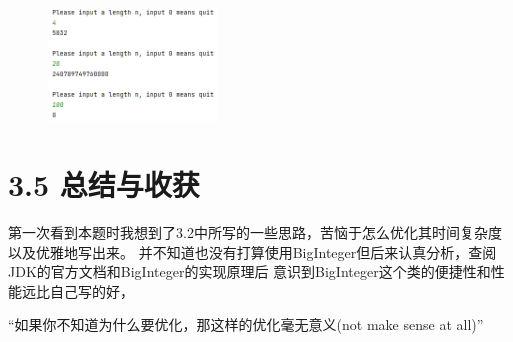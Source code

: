 \begin{figure}[H]
    \centering
    \includegraphics[width = 0.4\textwidth]{../pic/3/3.1.png}
\end{figure}

\section{3.5 总结与收获}

第一次看到本题时我想到了3.2中所写的一些思路，苦恼于怎么优化其时间复杂度以及优雅地写出来。
并不知道也没有打算使用BigInteger但后来认真分析，查阅JDK的官方文档和BigInteger的实现原理后
意识到BigInteger这个类的便捷性和性能远比自己写的好，

“如果你不知道为什么要优化，那这样的优化毫无意义(not make sense at all)” 

